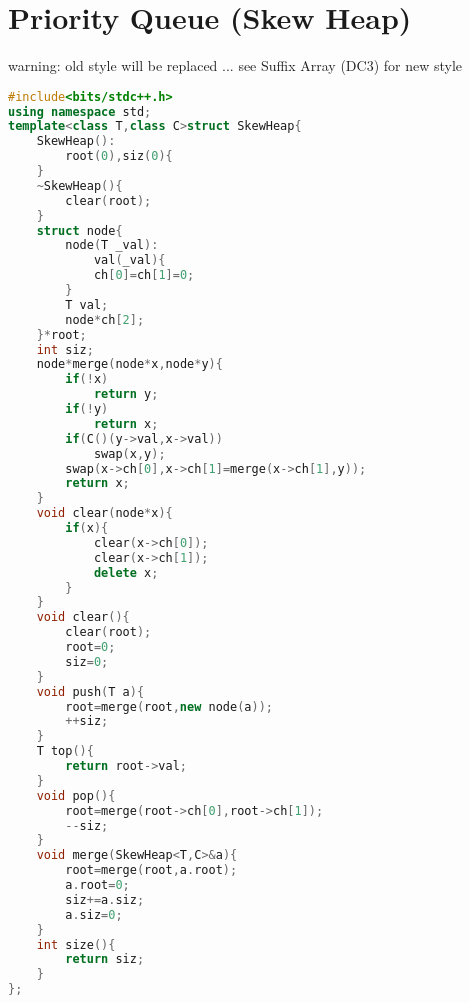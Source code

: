 \documentclass{book}
\begin{document}
\section{Priority Queue (Skew Heap)}
warning: old style will be replaced ... see Suffix Array (DC3) for new style\begin{lstlisting}[language=C++,title={Priority Queue (Skew Heap).hpp (1220 bytes, 61 lines)}]
#include<bits/stdc++.h>
using namespace std;
template<class T,class C>struct SkewHeap{
    SkewHeap():
        root(0),siz(0){
    }
    ~SkewHeap(){
        clear(root);
    }
    struct node{
        node(T _val):
            val(_val){
            ch[0]=ch[1]=0;
        }
        T val;
        node*ch[2];
    }*root;
    int siz;
    node*merge(node*x,node*y){
        if(!x)
            return y;
        if(!y)
            return x;
        if(C()(y->val,x->val))
            swap(x,y);
        swap(x->ch[0],x->ch[1]=merge(x->ch[1],y));
        return x;
    }
    void clear(node*x){
        if(x){
            clear(x->ch[0]);
            clear(x->ch[1]);
            delete x;
        }
    }
    void clear(){
        clear(root);
        root=0;
        siz=0;
    }
    void push(T a){
        root=merge(root,new node(a));
        ++siz;
    }
    T top(){
        return root->val;
    }
    void pop(){
        root=merge(root->ch[0],root->ch[1]);
        --siz;
    }
    void merge(SkewHeap<T,C>&a){
        root=merge(root,a.root);
        a.root=0;
        siz+=a.siz;
        a.siz=0;
    }
    int size(){
        return siz;
    }
};
\end{lstlisting}
\end{document}
